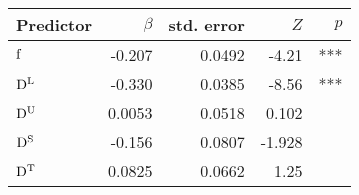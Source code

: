 \begin{tabular}{l r r r r}
\toprule
  Predictor & $\beta$ & std. error & $Z$ & $p$ \\ \midrule
$\mathrm{f}$ & -0.207 & 0.0492 & -4.21 & *** \\ 
$\mathrm{D^{L}}$ & -0.330 & 0.0385 & -8.56 & *** \\ 
$\mathrm{D^{U}}$ & 0.0053 & 0.0518 & 0.102 & ~ \\ 
$\mathrm{D^{S}}$ & -0.156 & 0.0807 & -1.928 & ~ \\ 
  $\mathrm{D^{T}}$ & 0.0825 & 0.0662 & 1.25 & ~ \\
  \bottomrule
\end{tabular}